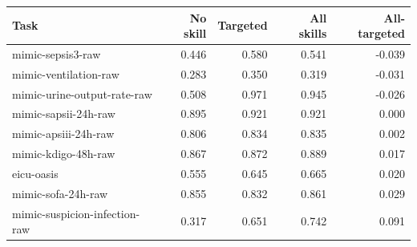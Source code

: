 \begin{tabular}{lrrrr}
\toprule
Task & No skill & Targeted & All skills & All-targeted \\
\midrule
mimic-sepsis3-raw & 0.446 & 0.580 & 0.541 & -0.039 \\
mimic-ventilation-raw & 0.283 & 0.350 & 0.319 & -0.031 \\
mimic-urine-output-rate-raw & 0.508 & 0.971 & 0.945 & -0.026 \\
mimic-sapsii-24h-raw & 0.895 & 0.921 & 0.921 & 0.000 \\
mimic-apsiii-24h-raw & 0.806 & 0.834 & 0.835 & 0.002 \\
mimic-kdigo-48h-raw & 0.867 & 0.872 & 0.889 & 0.017 \\
eicu-oasis & 0.555 & 0.645 & 0.665 & 0.020 \\
mimic-sofa-24h-raw & 0.855 & 0.832 & 0.861 & 0.029 \\
mimic-suspicion-infection-raw & 0.317 & 0.651 & 0.742 & 0.091 \\
\bottomrule
\end{tabular}
